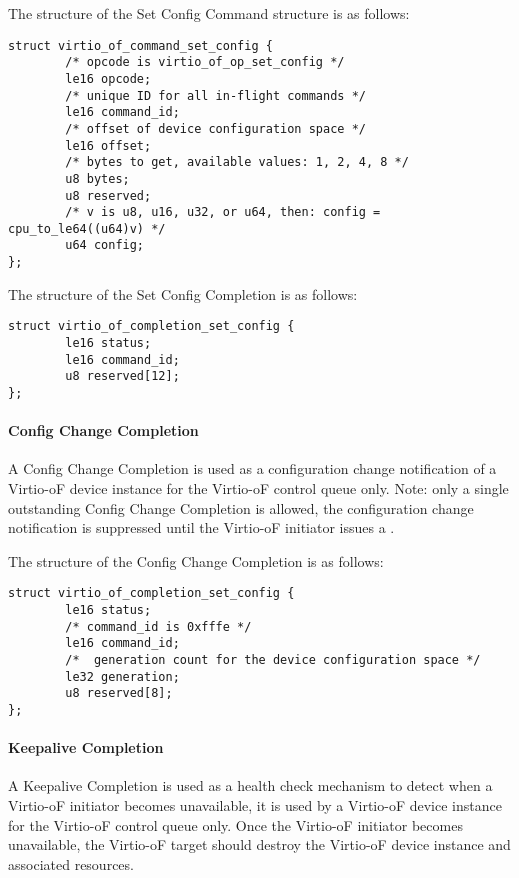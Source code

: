 The structure of the Set Config Command structure is as follows:
\begin{lstlisting}
struct virtio_of_command_set_config {
        /* opcode is virtio_of_op_set_config */
        le16 opcode;
        /* unique ID for all in-flight commands */
        le16 command_id;
        /* offset of device configuration space */
        le16 offset;
        /* bytes to get, available values: 1, 2, 4, 8 */
        u8 bytes;
        u8 reserved;
        /* v is u8, u16, u32, or u64, then: config = cpu_to_le64((u64)v) */
        u64 config;
};
\end{lstlisting}

The structure of the Set Config Completion is as follows:
\begin{lstlisting}
struct virtio_of_completion_set_config {
        le16 status;
        le16 command_id;
        u8 reserved[12];
};
\end{lstlisting}

\paragraph{Config Change Completion}\label{sec:Virtio Transport Options / Virtio Over Fabrics / Commands Definition / Opcodes / Config Change Completion}
A Config Change Completion is used as a configuration change notification of a Virtio-oF device instance for the Virtio-oF control queue only.
Note: only a single outstanding Config Change Completion is allowed, the configuration change notification is suppressed until the Virtio-oF initiator issues a
.

The structure of the Config Change Completion is as follows:
\begin{lstlisting}
struct virtio_of_completion_set_config {
        le16 status;
        /* command_id is 0xfffe */
        le16 command_id;
        /*  generation count for the device configuration space */
        le32 generation;
        u8 reserved[8];
};
\end{lstlisting}

\paragraph{Keepalive Completion}\label{sec:Virtio Transport Options / Virtio Over Fabrics / Commands Definition / Opcodes / Keepalive Completion}
A Keepalive Completion is used as a health check mechanism to detect when a Virtio-oF initiator becomes unavailable, it is used by a Virtio-oF device instance for the Virtio-oF control queue only.
Once the Virtio-oF initiator becomes unavailable, the Virtio-oF target should destroy the Virtio-oF device instance and associated resources.

